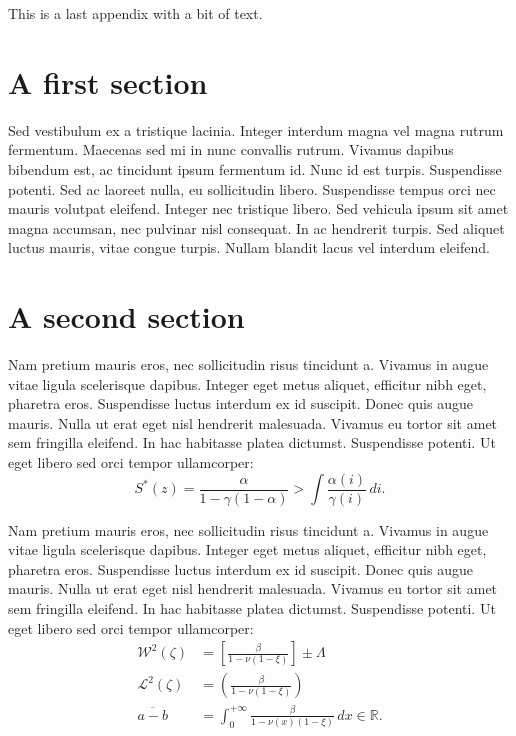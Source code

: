 This is a last appendix with a bit of text.

\section{A first section}

Sed vestibulum ex a tristique lacinia. Integer interdum magna vel magna rutrum fermentum. Maecenas sed mi in nunc convallis rutrum. Vivamus dapibus bibendum est, ac tincidunt ipsum fermentum id. Nunc id est turpis. Suspendisse potenti. Sed ac laoreet nulla, eu sollicitudin libero. Suspendisse tempus orci nec mauris volutpat eleifend. Integer nec tristique libero. Sed vehicula ipsum sit amet magna accumsan, nec pulvinar nisl consequat. In ac hendrerit turpis. Sed aliquet luctus mauris, vitae congue turpis. Nullam blandit lacus vel interdum eleifend. 

\section{A second section}

Nam pretium mauris eros, nec sollicitudin risus tincidunt a. Vivamus in augue vitae ligula scelerisque dapibus. Integer eget metus aliquet, efficitur nibh eget, pharetra eros. Suspendisse luctus interdum ex id suscipit. Donec quis augue mauris. Nulla ut erat eget nisl hendrerit malesuada. Vivamus eu tortor sit amet sem fringilla eleifend. In hac habitasse platea dictumst. Suspendisse potenti. Ut eget libero sed orci tempor ullamcorper:
\begin{equation}
S^*(z) = \frac{\alpha}{1-\gamma (1-\alpha)} > \int\frac{\alpha(i)}{\gamma(i)}\,di.
\label{e:type1Classical}\end{equation}

Nam pretium mauris eros, nec sollicitudin risus tincidunt a. Vivamus in augue vitae ligula scelerisque dapibus. Integer eget metus aliquet, efficitur nibh eget, pharetra eros. Suspendisse luctus interdum ex id suscipit. Donec quis augue mauris. Nulla ut erat eget nisl hendrerit malesuada. Vivamus eu tortor sit amet sem fringilla eleifend. In hac habitasse platea dictumst. Suspendisse potenti. Ut eget libero sed orci tempor ullamcorper:
\begin{align}
\mathcal{W}^{2}(\zeta) &= \left[\frac{\beta}{1-\nu (1-\xi)}\right] \pm \Lambda\\
\mathcal{L}^{2}(\zeta) &= \left(\frac{\beta}{1-\nu (1-\xi)}\right) \\
\overline{a-b} &= \int_0^{+\infty} \frac{\beta}{1-\nu(x) (1-\xi)}\,dx \in \mathbb{R}.
\end{align}


